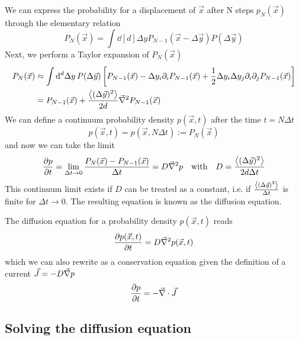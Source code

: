 \documentclass{notebook}
\begin{document}
We can express the probability for a displacement of $\vec{x}$ after N steps $p_N(\vec{x})$ through the elementary relation
%
\begin{equation}
P_N(\vec{x}) = \int{\dd[d]{\Delta y} P_{N-1}(\vec{x} - \Delta \vec{y}) P(\Delta \vec{y})}
\end{equation}
%
Next, we perform a Taylor expansion of $P_N(\vec{x})$
%
\begin{align*}
P_N(\vec{x}) &\approx \int{\dd[d]{\Delta y} P(\Delta \vec{y}) \left[ 
	P_{N-1}(\vec{x}) - \Delta y_i \partial_i P_{N-1}(\vec{x}) + \frac{1}{2}  \Delta y_i \Delta y_j \partial_i \partial_j P_{N-1}(\vec{x}) \right]} \\
&= P_{N-1}(\vec{x}) + \frac{\expval{(\Delta \vec{y})^2}}{2 d} \vec{\nabla}^2 P_{N-1}(\vec{x})	
\end{align*}
%
We can define a continuum probability density $p(\vec{x},t)$ after the time $t = N \Delta t$
%
\begin{equation}
p(\vec{x},t) = p(\vec{x}, N \Delta t) := P_N(\vec{x})
\end{equation}
%
and now we can take the limit
%
\begin{equation}
\pdv{p}{t} = \lim_{\Delta t \to 0} \frac{P_N(\vec{x}) - P_{N-1}(\vec{x})}{\Delta t} = D \vec{\nabla}^2 p \quad \mathrm{with} \quad D = \frac{\expval{(\Delta \vec{y})^2}}{2 d \Delta t}
\end{equation}
%
This continuum limit exists if $D$ can be treated as a constant, i.e. if $\frac{\expval{(\Delta \vec{y})^2}}{\Delta t}$ is finite for $\Delta t \to 0$. The resulting equation is known as the diffusion equation.

\newpage
%
\begin{theorem}
	The diffusion equation for a probability density $p(\vec{x}, t)$ reads
	\begin{equation}
	\pdv{p(\vec{x}, t)}{t} = D \vec{\nabla}^2 p(\vec{x}, t)
	\end{equation}
	which we can also rewrite as a conservation equation given the definition of a current $\vec{J} = -D \vec{\nabla} p$
	\begin{equation}
	\pdv{p}{t} = - \vec{\nabla} \cdot \vec{J}
	\end{equation}
\end{theorem}
%

\subsection*{Solving the diffusion equation}
\end{document}
